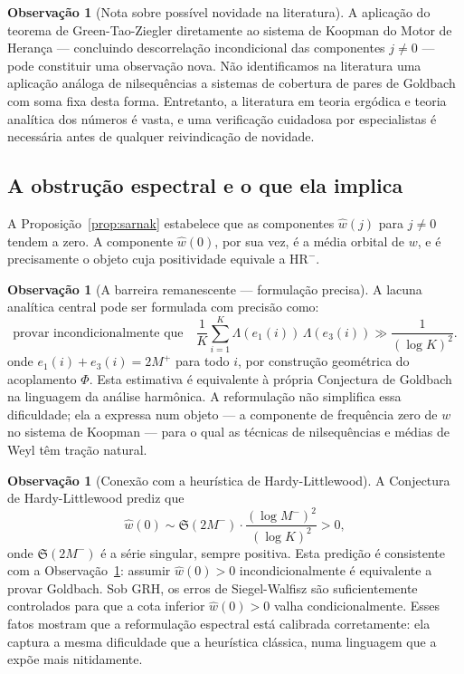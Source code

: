 \documentclass[12pt,a4paper]{article}
\theoremstyle{definition}
\newtheorem{remark}[theorem]{Observação}
\newcommand{\HRm}{\mathrm{HR}^{-}}
\begin{document}
	\begin{remark}[Nota sobre possível novidade na literatura]
		\label{rem:novidade}
		A aplicação do teorema de Green-Tao-Ziegler diretamente ao sistema
		de Koopman do Motor de Herança — concluindo descorrelação incondicional
		das componentes $j \neq 0$ — pode constituir uma observação nova.
		Não identificamos na literatura uma aplicação análoga de nilsequências
		a sistemas de cobertura de pares de Goldbach com soma fixa desta forma.
		Entretanto, a literatura em teoria ergódica e teoria analítica dos
		números é vasta, e uma verificação cuidadosa por especialistas é
		necessária antes de qualquer reivindicação de novidade.
	\end{remark}
	
	\subsection{A obstrução espectral e o que ela implica}
	
	A Proposição~\ref{prop:sarnak} estabelece que as componentes
	$\widehat{w}(j)$ para $j \neq 0$ tendem a zero. A componente
	$\widehat{w}(0)$, por sua vez, é a média orbital de $w$, e é
	precisamente o objeto cuja positividade equivale a $\HRm$.
	
	\begin{remark}[A barreira remanescente — formulação precisa]
		\label{rem:barreira}
		A lacuna analítica central pode ser formulada com precisão como:
		\[
		\text{provar incondicionalmente que}\quad
		\frac{1}{K}\sum_{i=1}^K \Lambda(e_1(i))\,\Lambda(e_3(i)) \gg
		\frac{1}{(\log K)^2}.
		\]
		onde $e_1(i)+e_3(i) = 2M^+$ para todo $i$, por construção
		geométrica do acoplamento $\Phi$.  Esta estimativa é equivalente
		à própria Conjectura de Goldbach na linguagem da análise harmônica.
		A reformulação não simplifica essa dificuldade; ela a expressa num
		objeto — a componente de frequência zero de $w$ no sistema de
		Koopman — para o qual as técnicas de nilsequências e médias de Weyl
		têm tração natural.
	\end{remark}
	
	\begin{remark}[Conexão com a heurística de Hardy-Littlewood]
		\label{rem:HL}
		A Conjectura de Hardy-Littlewood \cite{hardy-littlewood} prediz que
		\[
		\widehat{w}(0) \sim \mathfrak{S}(2M^-)\cdot\frac{(\log M^-)^2}{(\log K)^2} > 0,
		\]
		onde $\mathfrak{S}(2M^-)$ é a série singular, sempre positiva. Esta
		predição é consistente com a Observação~\ref{rem:barreira}: assumir
		$\widehat{w}(0) > 0$ incondicionalmente é equivalente a provar Goldbach.
		Sob GRH, os erros de Siegel-Walfisz são suficientemente controlados
		para que a cota inferior $\widehat{w}(0) > 0$ valha condicionalmente.
		Esses fatos mostram que a reformulação espectral está calibrada
		corretamente: ela captura a mesma dificuldade que a heurística clássica,
		numa linguagem que a expõe mais nitidamente.
	\end{remark}
	
\end{document}
